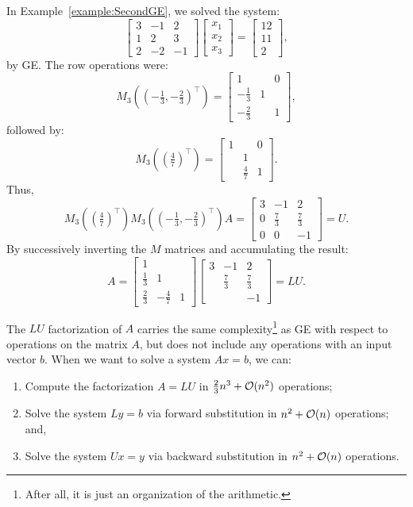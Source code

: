 \begin{example}
In Example~\ref{example:SecondGE}, we solved the system:
\[
\begin{bmatrix} 3 & -1 & 2\\ 1 & 2 & 3\\ 2 & -2 & -1\end{bmatrix}\begin{bmatrix} x_1\\x_2\\x_3\end{bmatrix} = \begin{bmatrix}12\\11\\2\end{bmatrix},
\]
by GE. The row operations were: 
\[
M_3((-\tfrac{1}{3},-\tfrac{2}{3})^\top) = \begin{bmatrix} 1 & & 0\\ -\frac{1}{3} & 1\\ -\frac{2}{3} & & 1\end{bmatrix},
\]
followed by:
\[
M_3((\tfrac{4}{7})^\top) = \begin{bmatrix} 1 & & 0\\ & 1\\ & \frac{4}{7} & 1\end{bmatrix}.
\]
Thus,
\[
M_3((\tfrac{4}{7})^\top)M_3((-\tfrac{1}{3},-\tfrac{2}{3})^\top)A = \begin{bmatrix} 3 & -1 & 2\\ 0 & \frac{7}{3} & \frac{7}{3}\\ 0 & 0 & -1\end{bmatrix} = U.
\]
By successively inverting the $M$ matrices and accumulating the result:
\[
A = \begin{bmatrix} 1\\ \frac{1}{3} & 1\\\frac{2}{3}&-\frac{4}{7}&1\end{bmatrix}\begin{bmatrix} 3 & -1 & 2\\ & \frac{7}{3} & \frac{7}{3}\\ & & -1\end{bmatrix} = LU.
\]
\end{example}

The $LU$ factorization of $A$ carries the same complexity\footnote{After all, it is just an organization of the arithmetic.} as GE with respect to operations on the matrix $A$, but does not include any operations with an input vector $b$. When we want to solve a system $Ax=b$, we can:
\begin{enumerate}
\item Compute the factorization $A=LU$ in $\frac{2}{3}n^3+\mathcal{O}(n^2)$ operations;
\item Solve the system $Ly = b$ via forward substitution in $n^2+\mathcal{O}(n)$ operations; and,
\item Solve the system $Ux = y$ via backward substitution in $n^2+\mathcal{O}(n)$ operations.
\end{enumerate}

